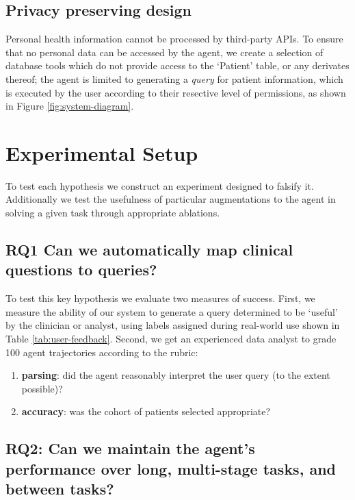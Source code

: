 \documentclass[11pt]{article}
\begin{document}
\subsection{Privacy preserving design}
Personal health information cannot be processed by third-party APIs.
To ensure that no personal data can be accessed by the agent, we create a selection of database tools which do not provide access to the `Patient' table, or any derivates thereof; the agent is limited to generating a \textit{query} for patient information, which is executed by the user according to their resective level of permissions, as shown in Figure \ref{fig:system-diagram}.


\section{Experimental Setup}
To test each hypothesis we construct an experiment designed to falsify it.
Additionally we test the usefulness of particular augmentations to the agent in solving a given task through appropriate ablations.

\subsection*{RQ1 Can we automatically map clinical questions to queries?}

To test this key hypothesis we evaluate two measures of success.
First, we measure the ability of our system to generate a query determined to be `useful' by the clinician or analyst, using labels assigned during real-world use shown in Table \ref{tab:user-feedback}.
Second, we get an experienced data analyst to grade 100 agent trajectories according to the rubric:
\begin{enumerate}
	\item \textbf{parsing}: did the agent reasonably interpret the user query (to the extent possible)?
	\item \textbf{accuracy}: was the cohort of patients selected appropriate? 
\end{enumerate}


\subsection*{RQ2: Can we maintain the agent's performance over long, multi-stage tasks, and between tasks?}
\end{document}
